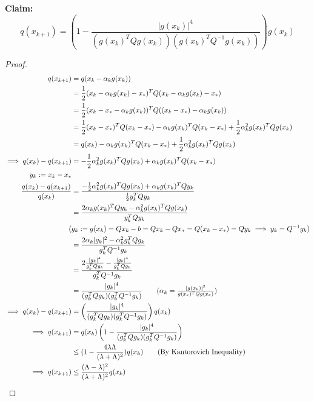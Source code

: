 \documentclass[11pt]{article}
\newcommand{\tb}[1]{\textbf{#1}}
\begin{document}
\tb{Claim:} \\
$$ q(x_{k+1}) = \left( 1 - \frac{|g(x_k)|^4}{(g(x_k)^TQ g(x_k))(g(x_k)^TQ^{-1}g(x_k))}\right)g(x_k)$$
\begin{proof}
\begin{align}
	q(x_{k+1}) &= q(x_k - \alpha_k g(x_k)) \\
	&= \frac{1}{2} (x_k - \alpha_k g(x_k) - x_*)^T Q (x_k - \alpha_k g(x_k) - x_*) \\
	&= \frac{1}{2} (x_k - x_* - \alpha_k g(x_k))^T Q ((x_k - x_*) - \alpha_k g(x_k)) \\
	&= \frac{1}{2} (x_k - x_*)^T Q (x_k - x_*) - \alpha_k g(x_k)^T Q (x_k - x_*) + \frac{1}{2} \alpha_k^2 g(x_k)^T Q g(x_k) \\
	&= q(x_k) - \alpha_k g(x_k)^T Q (x_k - x_*) + \frac{1}{2} \alpha_k^2 g(x_k)^T Q g(x_k) \\
	\implies q(x_k) - q(x_{k+1}) &= -\frac{1}{2} \alpha_k^2 g(x_k)^T Q g(x_k) + \alpha_k g(x_k)^T Q (x_k - x_*) \\
	y_k := x_k - x_* \\
	\frac{q(x_k) - q(x_{k+1})}{q(x_k)} &= \frac{-\frac{1}{2}\alpha_k^2 g(x_k)^T Q g(x_k) + \alpha_k g(x_k)^T Q y_k}{\frac{1}{2}y_k^T Q y_k}  \\
	&= \frac{2\alpha_k g(x_k)^T Q y_k - \alpha_k^2 g(x_k)^T Q g(x_k)}{y_k^T Q y_k} \\
	(&g_k := g(x_k) = Q x_k - b = Qx_k - Q x_* = Q (x_k - x_*) = Q y_k \implies y_k = Q^{-1}g_k) \\
	&= \frac{2\alpha_k|g_k|^2 - \alpha_k^2 g_k^T Q g_k}{g_k^TQ^{-1}g_k}\\ 
	&= \frac{2\frac{|g_k|^4}{g_k^TQg_k}  - \frac{|g_k|^4}{g_k^TQg_k}}{g_k^TQ^{-1}g_k}\\
	&= \frac{|g_k|^4}{(g_k^TQ g_k)(g_k^TQ^{-1}g_k)} \tag{$\alpha_k = \frac{|g(x_k)|^2}{g(x_k)^T Q g(x_k)}$} \\
	\implies q(x_k) - q(x_{k+1}) &= \left( \frac{|g_k|^4}{(g_k^TQ g_k)(g_k^TQ^{-1}g_k)} \right ) q(x_k) \\
	\implies q(x_{k+1}) &= q(x_k)\left( 1 - \frac{|g_k|^4}{(g_k^TQ g_k)(g_k^TQ^{-1}g_k)} \right) \\
	&\leq (1 - \frac{4 \lambda \Lambda}{(\lambda + \Lambda)^2}) q(x_k) \tag{By Kantorovich Inequality} \\
	\implies q(x_{k+1}) &\leq \frac{(\Lambda - \lambda)^2}{(\lambda + \Lambda)^2} q(x_k)
\end{align}

\end{proof}
\end{document}
